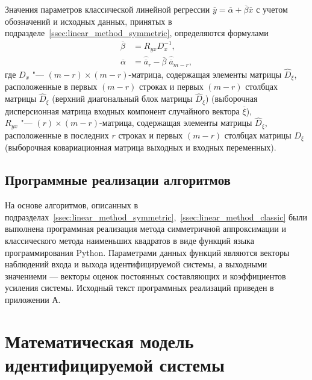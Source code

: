 Значения параметров классической линейной регрессии
\( \overline{y} = \overline{\alpha} + \overline{\beta} \overline{x} \)
с учетом обозначений и исходных данных, принятых в подразделе~\ref{ssec:linear_method_symmetric},
определяются формулами
\begin{equation*}
  \begin{aligned}
    \overline{\beta} &= R_{yx} D^{-1}_{x}, \\
    \overline{\alpha} &= \hat{\overline{a}}_{r} - \overline{\beta} \; \hat{\overline{a}}_{m-r},
  \end{aligned}
\end{equation*}
где \( D_x \) "--- \( (m-r) \times (m-r) \)-матрица, содержащая элементы матрицы \( \hat{D}_{\xi} \),
расположенные в первых \( (m-r) \) строках и первых \( (m-r) \) столбцах матрицы \( \hat{D}_{\xi} \)
(верхний диагональный блок матрицы \( \hat{D}_{\xi} \))
(выборочная дисперсионная матрица входных компонент случайного вектора \( \overline{\xi} \)), \\
\hspace*{7mm} \( R_{yx} \) "--- \( (r) \times (m-r) \)-матрица, содержащая элементы матрицы
\( \hat{D}_{\xi} \), расположенные в последних \( r \) строках и первых \( (m-r) \) столбцах
матрицы \( D_{\xi} \) (выборочная ковариационная матрица выходных и входных переменных).

\vspace{2\baselineskip}
\subsection{Программные реализации алгоритмов}

На основе алгоритмов, описанных в
подразделах~\ref{ssec:linear_method_symmetric},~\ref{ssec:linear_method_classic}
были выполнена программная реализация метода симметричной аппроксимации и
классического метода наименьших квадратов в виде функций
языка программирования Python.
Параметрами данных функций являются векторы наблюдений входа и выхода
идентифицируемой системы, а выходными значениеми ---
векторы оценок постоянных составляющих и коэффициентов усиления системы.
Исходный текст программных реализаций приведен в приложении А.

\vspace{2\baselineskip}
\section{Математическая модель идентифицируемой системы}

